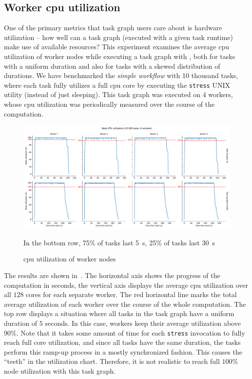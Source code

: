 \subsection{Worker \gls{cpu} utilization}
\label{sec:hq-cpu-utilization}
One of the primary metrics that task graph users care about is hardware utilization -- how well can
a task graph (executed with a given task runtime) make use of available resources? This experiment
examines the average \gls{cpu} utilization of worker nodes while executing a task
graph with \hyperqueue{}, both for tasks with a uniform duration and also for tasks with
a skewed distribution of durations. We have benchmarked the \emph{simple workflow} with
$10$ thousand tasks, where each task fully utilizes a full
\gls{cpu} core by executing the \texttt{stress} UNIX utility (instead of just
sleeping). This task graph was executed on $4$ workers, whose
\gls{cpu} utilization was periodically measured over the course of the computation.

\begin{figure}[h]
	\centering
	\includegraphics[width=\textwidth]{imgs/hq/charts/scalability-stress-utilization}

	In the bottom row, 75\% of tasks last \SI{5}{\second}, 25\% of tasks last
	\SI{30}{\second} \caption{\gls{cpu} utilization of \hyperqueue{} worker nodes} \label{fig:hq-cpu-utilization}
\end{figure}

The results are shown in~. The horizontal axis shows the progress of the
computation in seconds, the vertical axis displays the average \gls{cpu} utilization
over all $128$ cores for each separate worker. The red horizontal line marks the
total average utilization of each worker over the course of the whole computation. The top row
displays a situation where all tasks in the task graph have a uniform duration of
$5$ seconds. In this case, \hyperqueue{} workers keep their average
utilization above $90\%$. Note that it takes some amount of time for each
\texttt{stress} invocation to fully reach full core utilization, and since all tasks have
the same duration, the tasks perform this ramp-up process in a mostly synchronized fashion. This
causes the ``teeth'' in the utilization chart. Therefore, it is not realistic to reach full
$100\%$ node utilization with this task graph.


